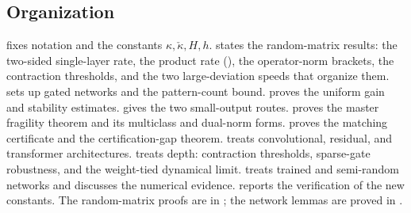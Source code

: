 \documentclass[11pt,reqno]{amsart}
\theoremstyle{plain}
\theoremstyle{definition}
\theoremstyle{remark}
\newcommand{\kcheck}{\check{\kappa}}
\begin{document}
\subsection{Organization}
 fixes notation and the constants $\kappa,\kcheck,H,h$.  states the
random-matrix results: the two-sided single-layer rate, the product rate
(), the operator-norm brackets, the contraction thresholds, and the two
large-deviation speeds that organize them.  sets up gated networks and the
pattern-count bound.  proves the uniform gain and stability estimates.
 gives the two small-output routes.  proves the master fragility
theorem and its multiclass and dual-norm forms.  proves the matching
certificate and the certification-gap theorem.  treats convolutional, residual, and
transformer architectures.  treats depth: contraction thresholds, sparse-gate
robustness, and the weight-tied dynamical limit.  treats trained and semi-random
networks and discusses the numerical evidence.  reports the verification of the
new constants. The random-matrix proofs are in ; the
network lemmas are proved in .














\appendix






\end{document}
